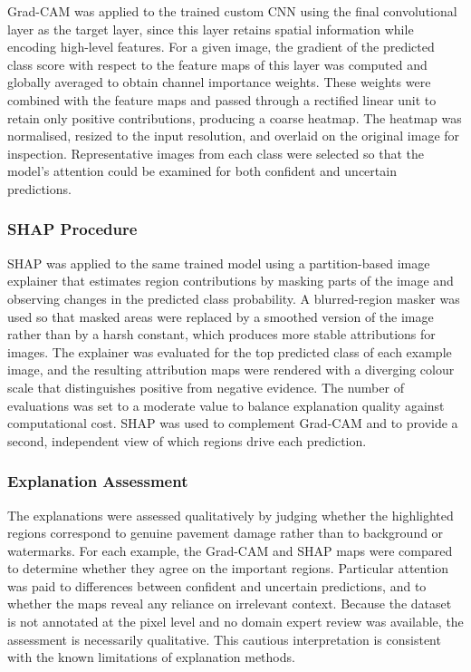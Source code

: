 \documentclass[preprint,12pt]{elsarticle}
\begin{document}
Grad-CAM was applied to the trained custom CNN using the final convolutional layer as the target layer, since this layer retains spatial information while encoding high-level features.
For a given image, the gradient of the predicted class score with respect to the feature maps of this layer was computed and globally averaged to obtain channel importance weights.
These weights were combined with the feature maps and passed through a rectified linear unit to retain only positive contributions, producing a coarse heatmap.
The heatmap was normalised, resized to the input resolution, and overlaid on the original image for inspection.
Representative images from each class were selected so that the model's attention could be examined for both confident and uncertain predictions.

\subsubsection{SHAP Procedure}

SHAP was applied to the same trained model using a partition-based image explainer that estimates region contributions by masking parts of the image and observing changes in the predicted class probability.
A blurred-region masker was used so that masked areas were replaced by a smoothed version of the image rather than by a harsh constant, which produces more stable attributions for images.
The explainer was evaluated for the top predicted class of each example image, and the resulting attribution maps were rendered with a diverging colour scale that distinguishes positive from negative evidence.
The number of evaluations was set to a moderate value to balance explanation quality against computational cost.
SHAP was used to complement Grad-CAM and to provide a second, independent view of which regions drive each prediction.

\subsubsection{Explanation Assessment}

The explanations were assessed qualitatively by judging whether the highlighted regions correspond to genuine pavement damage rather than to background or watermarks.
For each example, the Grad-CAM and SHAP maps were compared to determine whether they agree on the important regions.
Particular attention was paid to differences between confident and uncertain predictions, and to whether the maps reveal any reliance on irrelevant context.
Because the dataset is not annotated at the pixel level and no domain expert review was available, the assessment is necessarily qualitative.
This cautious interpretation is consistent with the known limitations of explanation methods.
\end{document}
